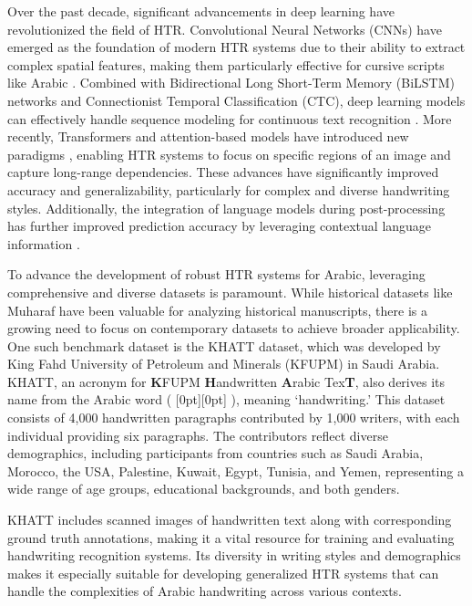 \documentclass[conference]{IEEEtran}
\newcommand{\artext}[1]{%
  {\fontsize{8pt}{11pt}\selectfont \raisebox{0pt}[0pt][0pt]{\RL{#1}}}%
}
\begin{document}
Over the past decade, significant advancements in deep learning have revolutionized the field of HTR. Convolutional Neural Networks (CNNs) have emerged as the foundation of modern HTR systems due to their ability to extract complex spatial features, making them particularly effective for cursive scripts like Arabic \cite{mosbah2024adocrnet, alrobah2022arabic, altwaijry2021arabic}. Combined with Bidirectional Long Short-Term Memory (BiLSTM) networks and Connectionist Temporal Classification (CTC), deep learning models can effectively handle sequence modeling for continuous text recognition \cite{ahmad2020deep, aabed2024end, mosbah2024adocrnet,mutawa2024machine}. More recently, Transformers and attention-based models have introduced new paradigms \cite{wang2020decoupled, li2023trocr, bhunia2021metahtr}, enabling HTR systems to focus on specific regions of an image and capture long-range dependencies. These advances have significantly improved accuracy and generalizability, particularly for complex and diverse handwriting styles. Additionally, the integration of language models during post-processing has further improved prediction accuracy by leveraging contextual language information \cite{mutawa2024machine}.

To advance the development of robust HTR systems for Arabic, leveraging comprehensive and diverse datasets is paramount. While historical datasets like Muharaf \cite{saeed2024muharaf} have been valuable for analyzing historical manuscripts, there is a growing need to focus on contemporary datasets to achieve broader applicability. One such benchmark dataset is the KHATT \cite{mahmoud2012khatt,mahmoud2014khatt} dataset, which was developed by King Fahd University of Petroleum and Minerals (KFUPM) in Saudi Arabia. KHATT, an acronym for \textbf{K}FUPM \textbf{H}andwritten \textbf{A}rabic Tex\textbf{T}, also derives its name from the Arabic word (\artext{خط}), meaning ‘handwriting.’ This dataset consists of 4,000 handwritten paragraphs contributed by 1,000 writers, with each individual providing six paragraphs. The contributors reflect diverse demographics, including participants from countries such as Saudi Arabia, Morocco, the USA, Palestine, Kuwait, Egypt, Tunisia, and Yemen, representing a wide range of age groups, educational backgrounds, and both genders.

KHATT includes scanned images of handwritten text along with corresponding ground truth annotations, making it a vital resource for training and evaluating handwriting recognition systems. Its diversity in writing styles and demographics makes it especially suitable for developing generalized HTR systems that can handle the complexities of Arabic handwriting across various contexts. 
\end{document}
